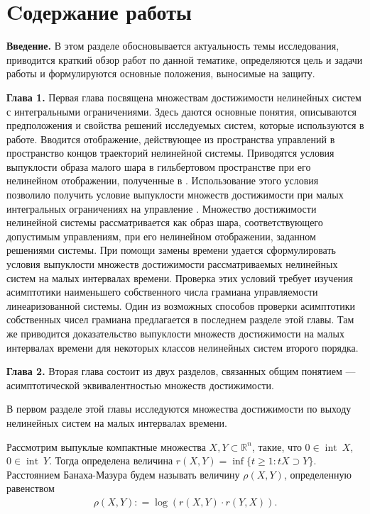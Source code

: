 \documentclass[../abstract.tex]{subfiles}
\begin{document}
\newpage
\section*{Cодержание работы}
\textbf{Введение.} 
В этом разделе обосновывается актуальность темы исследования, приводится краткий обзор работ по данной тематике, определяются цель и задачи работы и формулируются основные положения, выносимые на защиту.


\textbf{Глава 1.}
Первая глава посвящена множествам достижимости нелинейных систем с интегральными ограничениями.  
Здесь даются основные понятия, описываются предположения и свойства решений исследуемых систем, которые используются в работе. 
Вводится отображение, действующее из пространства управлений в пространство концов траекторий нелинейной системы. 
Приводятся условия выпуклости образа малого шара в гильбертовом пространстве при его нелинейном отображении, полученные в \cite{Polyak2001}. 
Использование этого условия позволило получить условие выпуклости множеств достижимости при малых интегральных ограничениях на управление \cite{Polyak2004}.
Множество достижимости нелинейной системы рассматривается как образ шара, соответствующего допустимым управлениям, при его нелинейном отображении, заданном решениями системы.
При помощи замены времени удается сформулировать условия выпуклости множеств достижимости рассматриваемых нелинейных систем на малых интервалах времени. 
Проверка этих условий требует изучения асимптотики наименьшего собственного числа грамиана управляемости линеаризованной системы.
Один из возможных способов проверки асимптотики собственных чисел грамиана предлагается в последнем разделе этой главы. 
Там же приводится доказательство выпуклости множеств достижимости на малых интервалах времени для некоторых классов нелинейных систем второго порядка. 

\textbf{Глава 2.}
Вторая глава состоит из двух разделов, связанных общим понятием --- асимптотической эквивалентностью множеств достижимости. 

В первом разделе этой главы исследуются множества достижимости по выходу нелинейных систем на малых интервалах времени.

Рассмотрим выпуклые компактные множества $ X,Y \subset \mathbb R^n $, такие, что $0 \in \operatorname{int}\ X$, $0 \in \operatorname{int}\ Y$. 
Тогда определена величина $r(X, Y) = \inf \{t \geqslant 1: tX \supset Y \}$. 
Расстоянием Банаха-Мазура будем называть величину $ \rho (X, Y) $, определенную равенством 
\begin{gather*}
	\rho (X, Y): = \log (r(X,Y) \cdot r(Y, X)).
\end{gather*}
\end{document}
